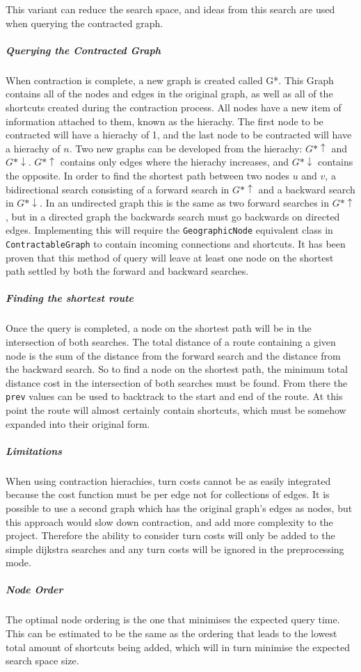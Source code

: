 \documentclass[11pt,twoside,a4paper]{article}
\begin{document}
This variant can reduce the search space, and ideas from this search are used when querying the contracted graph.
\subparagraph{Querying the Contracted Graph}
When contraction is complete, a new graph is created called G*. This Graph contains all of the nodes and edges in the original graph, as well as all of the shortcuts created during the contraction process.
All nodes have a new item of information attached to them, known as the hierachy. The first node to be contracted will have a hierachy of 1, and the last node to be contracted will have a hierachy of $n$. 
Two new graphs can be developed from the hierachy:
$G*\uparrow$ and $G*\downarrow$. $G*\uparrow$ contains only edges where the hierachy increases, and $G*\downarrow$ contains the opposite. In order to find the shortest path between two nodes $u$ and $v$, a bidirectional search
 consisting of a forward search in $G*\uparrow$ and a backward search in $G*\downarrow$. In an undirected graph this is the same as two forward searches in $G*\uparrow$, but in a directed graph the backwards search must go backwards on directed edges.
Implementing this will require the \texttt{GeographicNode} equivalent class in \texttt{ContractableGraph} to contain incoming connections and shortcuts. It has been proven\cite{Geisberger2012} that this method of query will leave at least one node on the shortest path settled by both the forward and backward searches.
\subparagraph{Finding the shortest route}
Once the query is completed, a node on the shortest path will be in the intersection of both searches. The total distance of a route containing a given node is the sum of the distance from the forward search and the distance from the backward search. So to find a node on the shortest path,
the minimum total distance cost in the intersection of both searches must be found. From there the \texttt{prev} values can be used to backtrack to the start and end of the route. At this point the route will almost certainly contain shortcuts, which must be somehow expanded into their original form.
\subparagraph{Limitations}
When using contraction hierachies, turn costs cannot be as easily integrated because the cost function must be per edge not for collections of edges. It is possible to use a second graph which has the original graph's edges as nodes, but this approach would slow down contraction, and add more complexity to the project.
Therefore the ability to consider turn costs will only be added to the simple dijkstra searches and any turn costs will be ignored in the preprocessing mode.
\subparagraph{Node Order}
The optimal node ordering is the one that minimises the expected query time. This can be estimated to be the same as the ordering that leads to the lowest total amount of shortcuts being added, which will in turn minimise the expected search space size.
\end{document}
